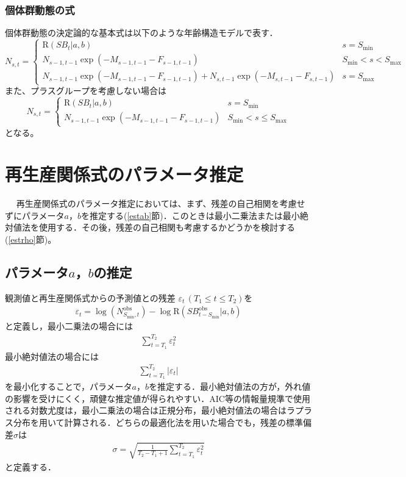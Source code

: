 \documentclass[11pt]{jsarticle}
\begin{document}
\subsubsection*{個体群動態の式}
個体群動態の決定論的な基本式は以下のような年齢構造モデルで表す．
\begin{equation}
  N_{s,t} = \begin{cases}
    \mathrm{R}(S\!B_{t}|a,b)  &     s = S_\mathrm{min} \\    
    N_{s-1, t-1}  \exp(-M_{s-1,t-1}-F_{s-1,t-1} )  &    S_\mathrm{min} < s < S_\mathrm{max} \\
    N_{s-1, t-1}  \exp(-M_{s-1,t-1}-F_{s-1,t-1} ) + N_{s, t-1}  \exp(-M_{s,t-1}-F_{s,t-1}) &   s=S_{\mathrm{max}}
  \end{cases}
  \label{future_eq}
\end{equation}
また、プラスグループを考慮しない場合は
\begin{equation}
  N_{s,t} = \begin{cases}
    \mathrm{R}(S\!B_{t}|a,b)  &     s = S_\mathrm{min} \\    
    N_{s-1, t-1}  \exp(-M_{s-1,t-1}-F_{s-1,t-1} )  &    S_\mathrm{min} < s \leq S_\mathrm{max}
  \end{cases}
  \label{future_eq_no_plus}
\end{equation}
となる。

\section{再生産関係式のパラメータ推定\label{SRest}}　
再生産関係式のパラメータ推定においては、まず、残差の自己相関を考慮せずにパラメータ$a$，$b$を推定する(\ref{estab}節)．このときは最小二乗法または最小絶対値法を使用する．その後，残差の自己相関も考慮するかどうかを検討する(\ref{estrho}節)。
\subsection{パラメータ$a$，$b$の推定\label{estab}}
観測値と再生産関係式からの予測値との残差 $\varepsilon_t \, (T_1 \leq t \leq T_2)$を
\begin{eqnarray}
  \varepsilon_t = \log (N_{S_{\mathrm{min}},t}^{\mathrm{obs}}) - \log \mathrm{R}(S\!B_{t-S_{\mathrm{min}}}^{\mathrm{obs}}|a,b)
  \label{eq:resid}
\end{eqnarray}
と定義し，最小二乗法の場合には
\begin{eqnarray}
  \sum_{t=T_1}^{T_2} \varepsilon_t^2
\end{eqnarray}
最小絶対値法の場合には
\begin{eqnarray}
  \sum_{t=T_1}^{T_2} | \varepsilon_t |
\end{eqnarray}
を最小化することで，パラメータ$a$，$b$を推定する．最小絶対値法の方が，外れ値の影響を受けにくく，頑健な推定値が得られやすい．AIC等の情報量規準で使用される対数尤度は，最小二乗法の場合は正規分布，最小絶対値法の場合はラプラス分布を用いて計算される．どちらの最適化法を用いた場合でも，残差の標準偏差$\sigma$は
\begin{eqnarray}
  \sigma = \sqrt{\frac{1}{T_2-T_1+1} \sum_{t=T_1}^{T_2} \varepsilon_t^2}
  \label{eq:sd}
\end{eqnarray}
と定義する．
\end{document}
